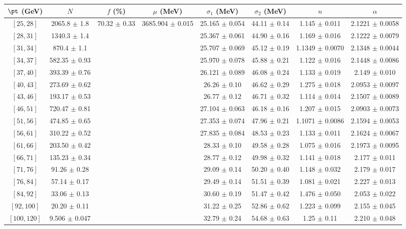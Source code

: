 \begin{tabular}{c||c|c|c|c|c|c|c}
$\pt$ (GeV) & $N$ & $f$ (\%) & $\mu$ (MeV) & $\sigma_1$ (MeV) & $\sigma_2$ (MeV) & $n$ & $\alpha$ \\
\hline
$[25, 28]$ & 2065.8 $\pm$ 1.8 & \multirow{17}{*}{70.32 $\pm$ 0.33} & \multirow{17}{*}{3685.904 $\pm$ 0.015} & 25.165 $\pm$ 0.054 & 44.11 $\pm$ 0.14 & 1.145 $\pm$ 0.011 & 2.1221 $\pm$ 0.0058\\
$[28, 31]$ & 1340.3 $\pm$ 1.4 &  &  & 25.367 $\pm$ 0.061 & 44.90 $\pm$ 0.16 & 1.169 $\pm$ 0.016 & 2.1222 $\pm$ 0.0079\\
$[31, 34]$ & 870.4 $\pm$ 1.1 &  &  & 25.707 $\pm$ 0.069 & 45.12 $\pm$ 0.19 & 1.1349 $\pm$ 0.0070 & 2.1348 $\pm$ 0.0044\\
$[34, 37]$ & 582.35 $\pm$ 0.93 &  &  & 25.970 $\pm$ 0.078 & 45.88 $\pm$ 0.21 & 1.122 $\pm$ 0.016 & 2.1448 $\pm$ 0.0086\\
$[37, 40]$ & 393.39 $\pm$ 0.76 &  &  & 26.121 $\pm$ 0.089 & 46.08 $\pm$ 0.24 & 1.133 $\pm$ 0.019 & 2.149 $\pm$ 0.010\\
$[40, 43]$ & 273.69 $\pm$ 0.62 &  &  & 26.26 $\pm$ 0.10 & 46.62 $\pm$ 0.29 & 1.275 $\pm$ 0.018 & 2.0953 $\pm$ 0.0097\\
$[43, 46]$ & 193.17 $\pm$ 0.53 &  &  & 26.77 $\pm$ 0.12 & 46.71 $\pm$ 0.32 & 1.114 $\pm$ 0.014 & 2.1507 $\pm$ 0.0089\\
$[46, 51]$ & 720.47 $\pm$ 0.81 &  &  & 27.104 $\pm$ 0.063 & 46.18 $\pm$ 0.16 & 1.207 $\pm$ 0.015 & 2.0903 $\pm$ 0.0073\\
$[51, 56]$ & 474.85 $\pm$ 0.65 &  &  & 27.353 $\pm$ 0.074 & 47.96 $\pm$ 0.21 & 1.1071 $\pm$ 0.0086 & 2.1594 $\pm$ 0.0053\\
$[56, 61]$ & 310.22 $\pm$ 0.52 &  &  & 27.835 $\pm$ 0.084 & 48.53 $\pm$ 0.23 & 1.133 $\pm$ 0.011 & 2.1624 $\pm$ 0.0067\\
$[61, 66]$ & 203.50 $\pm$ 0.42 &  &  & 28.33 $\pm$ 0.10 & 49.58 $\pm$ 0.28 & 1.075 $\pm$ 0.016 & 2.1973 $\pm$ 0.0095\\
$[66, 71]$ & 135.23 $\pm$ 0.34 &  &  & 28.77 $\pm$ 0.12 & 49.98 $\pm$ 0.32 & 1.141 $\pm$ 0.018 & 2.177 $\pm$ 0.011\\
$[71, 76]$ & 91.26 $\pm$ 0.28 &  &  & 29.09 $\pm$ 0.14 & 50.20 $\pm$ 0.40 & 1.148 $\pm$ 0.032 & 2.179 $\pm$ 0.017\\
$[76, 84]$ & 57.14 $\pm$ 0.17 &  &  & 29.49 $\pm$ 0.14 & 51.51 $\pm$ 0.39 & 1.081 $\pm$ 0.021 & 2.227 $\pm$ 0.013\\
$[84, 92]$ & 33.06 $\pm$ 0.13 &  &  & 30.60 $\pm$ 0.19 & 51.47 $\pm$ 0.42 & 1.476 $\pm$ 0.050 & 2.053 $\pm$ 0.022\\
$[92, 100]$ & 20.20 $\pm$ 0.11 &  &  & 31.22 $\pm$ 0.25 & 52.86 $\pm$ 0.62 & 1.223 $\pm$ 0.099 & 2.155 $\pm$ 0.045\\
$[100, 120]$ & 9.506 $\pm$ 0.047 &  &  & 32.79 $\pm$ 0.24 & 54.68 $\pm$ 0.63 & 1.25 $\pm$ 0.11 & 2.210 $\pm$ 0.048\\
\end{tabular}
